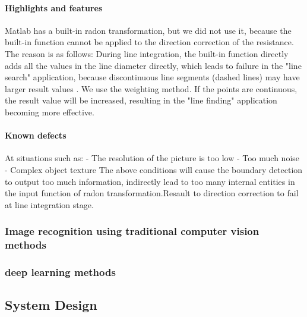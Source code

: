 \documentclass{article}
\begin{document}
\paragraph{Highlights and features}

Matlab has a built-in radon transformation, but we did not use it, because the built-in function cannot be applied to the direction correction of the resistance. The reason is as follows: During line integration, the built-in function directly adds all the values in the line diameter directly, which leads to failure in the "line search" application, because discontinuous line segments (dashed lines) may have larger result values .
We use the weighting method. If the points are continuous, the result value will be increased, resulting in the "line finding" application becoming more effective.

\paragraph{Known defects}

At situations such as:
- The resolution of the picture is too low
- Too much noise
- Complex object texture
The above conditions will cause the boundary detection to output too much information, indirectly lead to too many internal entities in the input function of radon transformation.Resault to direction correction to fail at line integration stage.


\subsubsection{Image recognition using traditional computer vision methods}
\subsubsection{deep learning methods}
\subsection{System Design}
\end{document}

